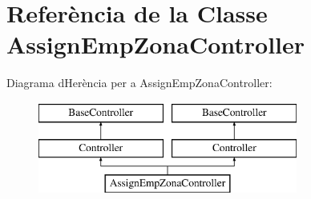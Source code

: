 \hypertarget{class_app_1_1_http_1_1_controllers_1_1_assign_emp_zona_controller}{}\section{Referència de la Classe Assign\+Emp\+Zona\+Controller}
\label{class_app_1_1_http_1_1_controllers_1_1_assign_emp_zona_controller}
Diagrama d\textquotesingle{}Herència per a Assign\+Emp\+Zona\+Controller\+:\begin{figure}[H]
\begin{center}
\leavevmode
\includegraphics[height=3.000000cm]{class_app_1_1_http_1_1_controllers_1_1_assign_emp_zona_controller}
\end{center}
\end{figure}
